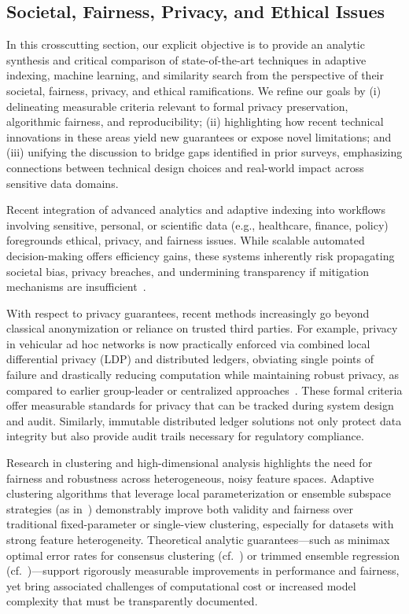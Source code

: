\documentclass[sigconf]{acmart}
\begin{document}
\subsection{Societal, Fairness, Privacy, and Ethical Issues}

In this crosscutting section, our explicit objective is to provide an analytic synthesis and critical comparison of state-of-the-art techniques in adaptive indexing, machine learning, and similarity search from the perspective of their societal, fairness, privacy, and ethical ramifications. We refine our goals by (i) delineating measurable criteria relevant to formal privacy preservation, algorithmic fairness, and reproducibility; (ii) highlighting how recent technical innovations in these areas yield new guarantees or expose novel limitations; and (iii) unifying the discussion to bridge gaps identified in prior surveys, emphasizing connections between technical design choices and real-world impact across sensitive data domains.

Recent integration of advanced analytics and adaptive indexing into workflows involving sensitive, personal, or scientific data (e.g., healthcare, finance, policy) foregrounds ethical, privacy, and fairness issues. While scalable automated decision-making offers efficiency gains, these systems inherently risk propagating societal bias, privacy breaches, and undermining transparency if mitigation mechanisms are insufficient~\cite{ref16,ref17,ref18,ref20,ref31,ref32,ref33,ref34,ref35,ref36,ref38,ref39,ref40,ref41,ref42,ref43,ref44,ref45}.

With respect to privacy guarantees, recent methods increasingly go beyond classical anonymization or reliance on trusted third parties. For example, privacy in vehicular ad hoc networks is now practically enforced via combined local differential privacy (LDP) and distributed ledgers, obviating single points of failure and drastically reducing computation while maintaining robust privacy, as compared to earlier group-leader or centralized approaches~\cite{ref17,ref20}. These formal criteria offer measurable standards for privacy that can be tracked during system design and audit. Similarly, immutable distributed ledger solutions not only protect data integrity but also provide audit trails necessary for regulatory compliance.

Research in clustering and high-dimensional analysis highlights the need for fairness and robustness across heterogeneous, noisy feature spaces. Adaptive clustering algorithms that leverage local parameterization or ensemble subspace strategies (as in~\cite{ref16,ref116,ref97}) demonstrably improve both validity and fairness over traditional fixed-parameter or single-view clustering, especially for datasets with strong feature heterogeneity. Theoretical analytic guarantees---such as minimax optimal error rates for consensus clustering (cf.~\cite{ref116}) or trimmed ensemble regression (cf.~\cite{ref97})---support rigorously measurable improvements in performance and fairness, yet bring associated challenges of computational cost or increased model complexity that must be transparently documented.
\end{document}
